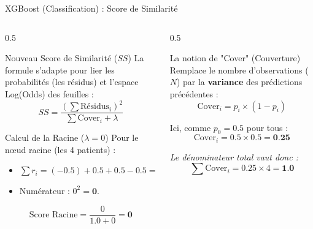 \begin{frame}{XGBoost (Classification) : Score de Similarité}
    \begin{columns}[T]
        \begin{column}{0.5\textwidth}
            \begin{block}{Nouveau Score de Similarité ($SS$)}
                \small
                La formule s'adapte pour lier les probabilités (les résidus) et l'espace Log(Odds) des feuilles :
                $$ SS = \frac{(\sum \text{Résidus}_i)^2}{\sum \text{Cover}_i + \lambda} $$
            \end{block}
            
            \begin{block}{Calcul de la Racine ($\lambda=0$)}
                \scriptsize
                Pour le nœud racine (les 4 patients) :
                \begin{itemize}
                    \setlength\itemsep{0em}
                    \item $\sum r_i = (-0.5) + 0.5 + 0.5 - 0.5 = 0$
                    \item Numérateur : $0^2 = \textbf{0}$.
                \end{itemize}
                
                $$ \text{Score Racine} = \frac{0}{1.0 + 0} = \textbf{0} $$
            \end{block}
        \end{column}
        
        \begin{column}{0.5\textwidth}
            \begin{block}{La notion de "Cover" (Couverture)}
                \small
                Remplace le nombre d'observations ($N$) par la \textbf{variance} des prédictions précédentes :
                $$ \text{Cover}_i = p_i \times (1 - p_i) $$
                
                \footnotesize
                \vspace{0.1cm}
                Ici, comme $p_0=0.5$ pour tous :
                $$ \text{Cover}_i = 0.5 \times 0.5 = \textbf{0.25} $$
                
                \vspace{0.1cm}
                \textit{Le dénominateur total vaut donc :}
                $$ \sum \text{Cover}_i = 0.25 \times 4 = \textbf{1.0} $$
            \end{block}
        \end{column}
    \end{columns}
\end{frame}

